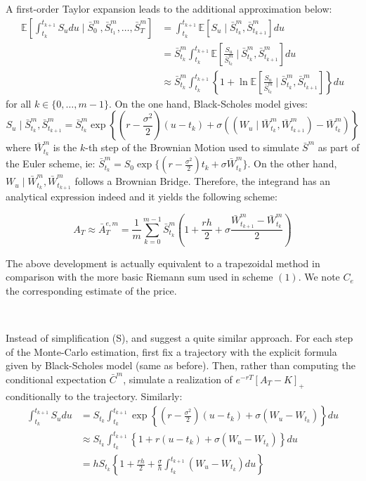 \documentclass{article}
\begin{document}
A first-order Taylor expansion leads to the additional approximation below:
\begin{align*}
	\mathbb E \left[ \int_{t_k}^{t_{k+1}} S_u du \mid \bar S_0^m, \bar S_{t_1}^m, \dots, \bar S_T^m \right]
	&= \int_{t_k}^{t_{k+1}} \mathbb E \left[ S_u \mid \bar S_{t_k}^m, \bar S_{t_{k+1}}^m \right] du \\
	&= \bar S_{t_k}^m \int_{t_k}^{t_{k+1}} \mathbb E \left[ \frac{S_u}{\bar S_{t_k}^m}
		\ \Big\vert \ \bar S_{t_k}^m, \bar S_{t_{k+1}}^m \right] du \\
	&\approx
		\bar S_{t_k}^m \int_{t_k}^{t_{k+1}} \left\{ 1 + \ln \mathbb E \left[ \frac{S_u}{\bar S_{t_k}^m}
		\ \Big\vert \ \bar S_{t_k}^m, \bar S_{t_{k+1}}^m \right] \right\} du
\end{align*}
for all $k \in \{ 0, \dots, m - 1 \}$. On the one hand, Black-Scholes model gives:
\[
	S_u \mid \bar S_{t_k}^m, \bar S_{t_{k+1}}^m = \bar S_{t_k}^m \exp
	\left\{ \left( r - \frac{\sigma^2}{2} \right) (u - t_k) + \sigma
	\left ( \left( W_u \mid \bar W_{t_k}^m, \bar W_{t_{k+1}}^m \right) - \bar W_{t_k}^m \right) \right\}
\]
where $\bar W_{t_k}^m$ is the $k$-th step of the Brownian Motion used to simulate $\bar S^m$ as
part of the Euler scheme, ie:
$\bar S_{t_k}^m = S_0 \exp \{ ( r - \frac{\sigma^2}{2} ) t_k + \sigma \bar W_{t_k}^m \}$.
On the other hand, $W_u \mid \bar W_{t_k}^m, \bar W_{t_{k+1}}^m$ follows a Brownian Bridge.
Therefore, the integrand has an analytical expression indeed and it yields the following scheme:

\begin{equation}
    A_T \approx \bar A_T^{e, m} = \frac{1}{m} \sum_{k=0}^{m-1} \bar S_{t_k}^m
    	\left( 1 + \frac{rh}{2} + \sigma \frac{\bar W_{t_{k+1}}^m - \bar W_{t_k}^m}{2} \right) \tag{2}
\end{equation}

The above development is actually equivalent to a trapezoidal method in comparison with the more
basic Riemann sum used in scheme $(1)$. We note $C_e$ the corresponding estimate of the price.

\

Instead of simplification (S), \cite{Bouchard} and \cite{main} suggest a quite similar approach. For each step
of the Monte-Carlo estimation, first fix a trajectory with the explicit formula given by Black-Scholes model
(same as before). Then, rather than computing the conditional expectation $\bar C^m$, simulate a realization of
$e^{-rT} \left[ A_T - K \right]_+$ conditionally to the trajectory. Similarly:
\begin{align*}
	\int_{t_k}^{t_{k+1}} S_u du
	&= S_{t_k} \int_{t_k}^{t_{k+1}} \exp \left\{ \left( r - \frac{\sigma^2}{2} \right) (u - t_k) + \sigma
	\left( W_u - W_{t_k} \right) \right\} du \\
	&\approx
	S_{t_k} \int_{t_k}^{t_{k+1}} \left\{ 1 + r (u - t_k) + \sigma \left( W_u - W_{t_k} \right) \right\} du \\
	&= h S_{t_k} \left\{ 1 + \frac{rh}{2} + \frac{\sigma}{h} \int_{t_k}^{t_{k+1}} \left( W_u - W_{t_k} \right) du \right\}
\end{align*}
\end{document}
